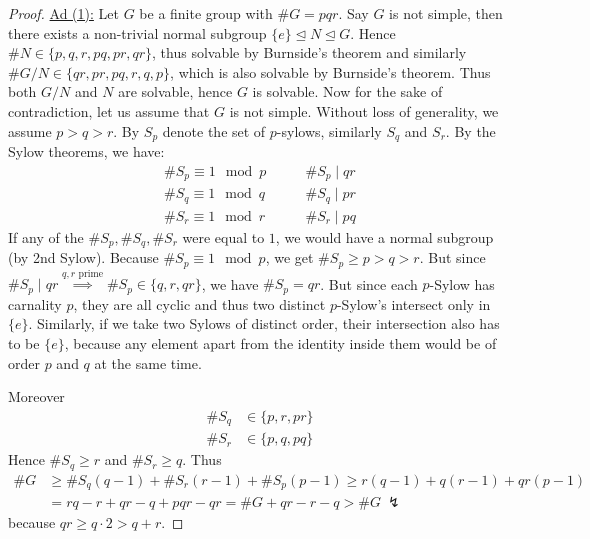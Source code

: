 \documentclass[twoside = false,	%
		headsepline,		%
		parskip = true,
		]{scrbook}						%
\begin{document}
   \begin{proof}
    \underline{Ad (1):}
        Let $G$ be a finite group with $\#G = p q r$. Say $G$ is not simple, then there exists a non-trivial normal subgroup $\{e\} \trianglelefteq N \trianglelefteq G$. Hence $\#N \in \{p,q,r,pq,pr,qr\}$, thus solvable by Burnside's theorem and similarly $\# G/N \in \{qr,pr,pq,r,q,p\}$, which is also solvable by Burnside's theorem. Thus both $G/N$ and $N$ are solvable, hence $G$ is solvable.
        Now for the sake of contradiction, let us assume that $G$ is not simple. Without loss of generality, we assume $p > q > r$. By $S_p$ denote the set of $p$-sylows, similarly $S_q$ and $S_r$. By the Sylow theorems, we have:
        \begin{equation*}
        \begin{split}
            \#S_p \equiv 1 \mod p &\qquad \#S_p \mid qr \\
            \#S_q \equiv 1 \mod q &\qquad \#S_q \mid pr \\
            \#S_r \equiv 1 \mod r &\qquad \#S_r \mid pq
        \end{split}
        \end{equation*}
        If any of the $\#S_p,\#S_q,\#S_r$ were equal to $1$, we would have a normal subgroup (by 2nd Sylow). Because $\#S_p \equiv 1 \mod p$, we get $\#S_p \geq p > q > r$. But since $\#S_p \mid qr \overset{q,r
        \text{ prime}}{\implies} \#S_p \in \{q,r,qr\}$, we have $\#S_p = qr$. But since each $p$-Sylow has carnality $p$, they are all cyclic and thus two distinct $p$-Sylow's intersect only in $\{e\}$. Similarly, if we take two Sylows of distinct order, their intersection also has to be $\{e\}$, because any element apart from the identity inside them would be of order $p$ and $q$ at the same time.

        Moreover
        \begin{equation*}
        \begin{split}
            \#S_q &\in \{p,r,pr\} \\
            \#S_r &\in \{p,q,pq\}
        \end{split}
        \end{equation*}
        Hence $\#S_q \geq r$ and $\#S_r \geq q$. Thus
        \begin{equation*}
        \begin{split}
            \#G &\geq \#S_q (q-1) + \#S_r(r-1) + \#S_p(p-1) \geq r(q-1) + q(r-1) + qr(p-1) \\
            &= rq - r +qr - q + pqr - qr = \#G + qr - r - q > \#G \ \lightning 
        \end{split}
        \end{equation*}
        because $qr \geq q \cdot 2 > q + r$.
        

\end{proof}
\end{document}
